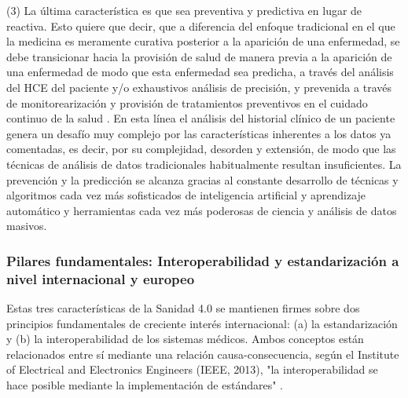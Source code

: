 
(3) La última característica es que sea preventiva y predictiva en lugar de reactiva. Esto quiere que decir, que a diferencia del enfoque tradicional en el que la medicina es meramente curativa posterior a la aparición de una enfermedad, se debe transicionar hacia la provisión de salud de manera previa a la aparición de una enfermedad de modo que esta enfermedad sea predicha, a través del análisis del HCE del paciente y/o exhaustivos análisis de precisión, y prevenida a través de monitorearización y provisión de tratamientos preventivos en el cuidado continuo de la salud \cite{ruiz2023inteligencia}. En esta línea el análisis del historial clínico de un paciente genera un desafío muy complejo por las características inherentes a los datos ya comentadas, es decir, por su complejidad, desorden y extensión, de modo que las técnicas de análisis de datos tradicionales habitualmente resultan insuficientes. La prevención y la predicción se alcanza gracias al constante desarrollo de técnicas y algoritmos cada vez más sofisticados de inteligencia artificial y aprendizaje automático y herramientas cada vez más poderosas de ciencia y análisis de datos masivos.



\subsubsection{Pilares fundamentales: Interoperabilidad y estandarización a nivel internacional y europeo}

Estas tres características de la Sanidad 4.0 se mantienen firmes sobre dos principios fundamentales de creciente interés internacional: (a) la estandarización y (b) la interoperabilidad de los sistemas médicos. Ambos conceptos están relacionados entre sí mediante una relación causa-consecuencia, según el Institute of Electrical and Electronics Engineers (IEEE, 2013), "la interoperabilidad se hace posible mediante la implementación de estándares" \cite{berryman2013data}.

